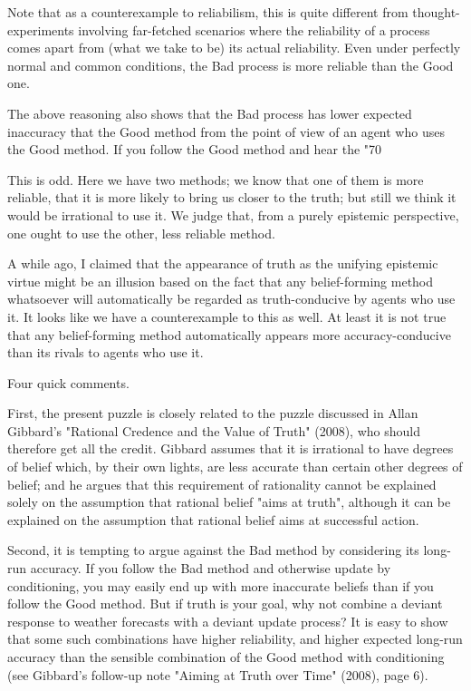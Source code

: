 \documentclass{article}
\begin{document}
Note that as a counterexample to reliabilism, this is quite different from thought-experiments involving far-fetched scenarios where the reliability of a process comes apart from (what we take to be) its actual reliability. Even under perfectly normal and common conditions, the Bad process is more reliable than the Good one.

The above reasoning also shows that the Bad process has lower expected inaccuracy that the Good method from the point of view of an agent who uses the Good method. If you follow the Good method and hear the "70%

This is odd. Here we have two methods; we know that one of them is more reliable, that it is more likely to bring us closer to the truth; but still we think it would be irrational to use it. We judge that, from a purely epistemic perspective, one ought to use the other, less reliable method.

A while ago, I claimed that the appearance of truth as the unifying epistemic virtue might be an illusion based on the fact that any belief-forming method whatsoever will automatically be regarded as truth-conducive by agents who use it. It looks like we have a counterexample to this as well. At least it is not true that any belief-forming method automatically appears more accuracy-conducive than its rivals to agents who use it.

Four quick comments.

First, the present puzzle is closely related to the puzzle discussed in Allan Gibbard's "Rational Credence and the Value of Truth" (2008), who should therefore get all the credit. Gibbard assumes that it is irrational to have degrees of belief which, by their own lights, are less accurate than certain other degrees of belief; and he argues that this requirement of rationality cannot be explained solely on the assumption that rational belief "aims at truth", although it can be explained on the assumption that rational belief aims at successful action.

Second, it is tempting to argue against the Bad method by considering its long-run accuracy. If you follow the Bad method and otherwise update by conditioning, you may easily end up with more inaccurate beliefs than if you follow the Good method. But if truth is your goal, why not combine a deviant response to weather forecasts with a deviant update process? It is easy to show that some such combinations have higher reliability, and higher expected long-run accuracy than the sensible combination of the Good method with conditioning (see Gibbard's follow-up note "Aiming at Truth over Time" (2008), page 6).
\end{document}

